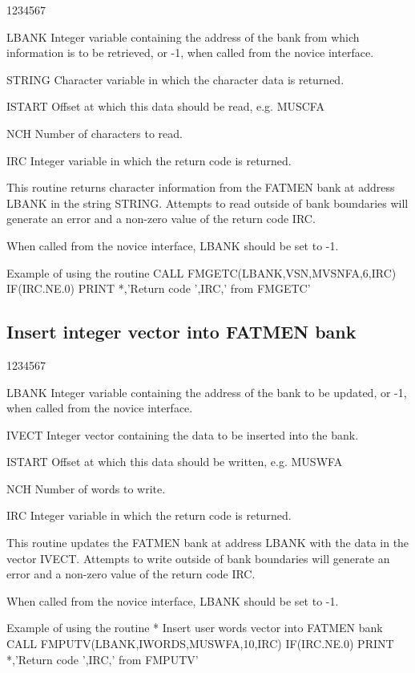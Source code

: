 
\begin{DLtt}{1234567}
\item[LBANK ]
Integer variable containing the address of the bank from which
information is to be retrieved,
or -1, when called from
the novice interface.
\item[STRING]
Character variable in which the character data is returned.
\item[ISTART]
Offset at which this data should be read, e.g. MUSCFA
\item[NCH]
Number of characters to read.
\item[IRC]
Integer variable in which the return code is returned.
\end{DLtt}

This routine returns character information from
the FATMEN bank at address LBANK
in the string STRING. Attempts to read outside of
bank boundaries will generate an error and a non-zero value of the
return code IRC.
\par
When called from the novice interface, LBANK should be set to -1.
\begin{XMPt}{Example of using the \protect{} routine}
      CALL FMGETC(LBANK,VSN,MVSNFA,6,IRC)
      IF(IRC.NE.0) PRINT *,'Return code ',IRC,' from FMGETC'
\end{XMPt}

\subsection{Insert integer vector into FATMEN bank}


\begin{DLtt}{1234567}
\item[LBANK]
Integer variable containing the address of the bank to be updated,
or -1, when called from
the novice interface.
\item[IVECT ]
Integer vector containing the data to be inserted into the bank.
\item[ISTART]
Offset at which this data should be written, e.g. MUSWFA
\item[NCH]
Number of words to write.
\item[IRC]
Integer variable in which the return code is returned.
\end{DLtt}
\par
This routine updates the FATMEN bank at address LBANK with the
data in the vector IVECT. Attempts to write outside of
bank boundaries will generate an error and a non-zero value of the
return code IRC.
\par
When called from the novice interface, LBANK should be set to -1.
\begin{XMPt}{Example of using the \protect{} routine}
*     Insert user words vector into FATMEN bank
      CALL FMPUTV(LBANK,IWORDS,MUSWFA,10,IRC)
      IF(IRC.NE.0) PRINT *,'Return code ',IRC,' from FMPUTV'
\end{XMPt}
